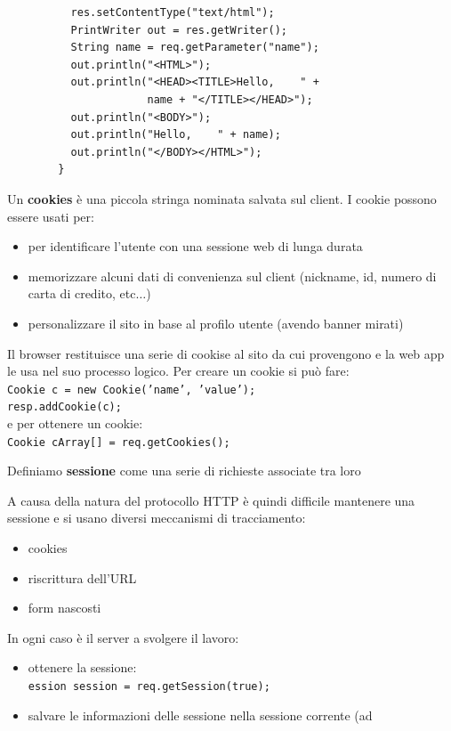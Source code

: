 \documentclass[a4paper,12pt, oneside]{book}
\begin{document}
\begin{shaded}
\begin{esempio}
\begin{verbatim}
          res.setContentType("text/html");
          PrintWriter out = res.getWriter();
          String name = req.getParameter("name");
          out.println("<HTML>");
          out.println("<HEAD><TITLE>Hello,    " +
                      name + "</TITLE></HEAD>");
          out.println("<BODY>");
          out.println("Hello,    " + name);
          out.println("</BODY></HTML>");
        }
      \end{verbatim}
  \end{esempio}
  Un \textbf{cookies} è una piccola stringa nominata salvata sul client. I cookie
  possono essere usati per:
  \begin{itemize}
    \item per identificare l'utente con una sessione web di lunga durata 
    \item memorizzare alcuni dati di convenienza sul client (nickname, id,
    numero di carta di credito, etc$\ldots$) 
    \item personalizzare il sito in base al profilo utente (avendo banner
    mirati) 
  \end{itemize}
  Il browser restituisce una serie di cookise al sito da cui provengono e la web
  app le usa nel suo processo logico. Per creare un cookie si può fare:\\
  \texttt{Cookie c = new Cookie('name', 'value'); \\resp.addCookie(c); }\\
  e per ottenere un cookie: \\
  \texttt{Cookie cArray[] = req.getCookies();}
  \begin{definizione}
    Definiamo \textbf{sessione} come una serie di richieste associate tra loro
  \end{definizione}
  A causa della natura del protocollo HTTP è quindi difficile mantenere una
  sessione e si usano diversi meccanismi di tracciamento:
  \begin{itemize}
    \item cookies
    \item riscrittura dell'URL
    \item form nascosti
  \end{itemize}
  In ogni caso è il server a svolgere il lavoro:
  \begin{itemize}
    \item ottenere la sessione:\\
    \texttt{ession session = req.getSession(true);}
    \item salvare le informazioni delle sessione nella sessione corrente (ad

\end{itemize}
\end{shaded}
\end{document}
